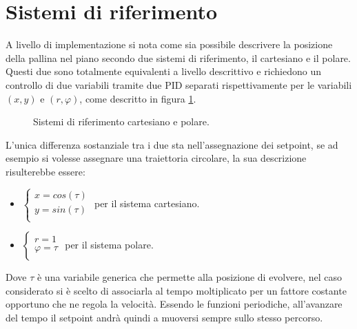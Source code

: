 \documentclass[12pt,twoside,openright]{report}
\begin{document}
\section{Sistemi di riferimento}\label{sistemidiriferimento}
A livello di implementazione si nota come sia possibile descrivere la posizione della pallina nel piano secondo due sistemi di riferimento, il cartesiano e il polare. Questi due sono totalmente equivalenti a livello descrittivo e richiedono un controllo di due variabili tramite due PID separati rispettivamente per le variabili $(x,y)$ e $(r,\varphi)$, come descritto in figura \ref{fig:sistemiriferimento}.
\begin{figure}[h!]
\centering
{}
\caption{Sistemi di riferimento cartesiano e polare.} \label{fig:sistemiriferimento}
\end{figure}
L'unica differenza sostanziale tra i due sta nell'assegnazione dei setpoint, se ad esempio si volesse assegnare una traiettoria circolare, la sua descrizione risulterebbe essere:
\begin{itemize}
\item
    $\begin{cases}
      x=cos(\tau)\\
      y=sin(\tau)\\
    \end{cases}$
 per il sistema cartesiano.
\item $\begin{cases}
      r=1\\
      \varphi=\tau\\
    \end{cases}$ per il sistema polare.
\end{itemize}
Dove $\tau$ è una variabile generica che permette alla posizione di evolvere, nel caso considerato si è scelto di associarla al tempo moltiplicato per un fattore costante opportuno che ne regola la velocità. Essendo le funzioni periodiche, all'avanzare del tempo il setpoint andrà quindi a muoversi sempre sullo stesso percorso.
\end{document}
